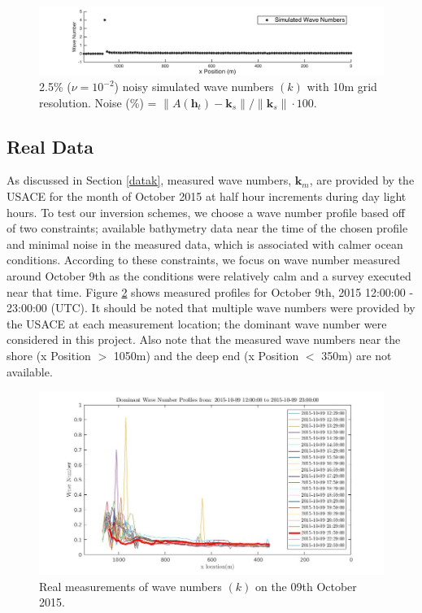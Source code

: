 \begin{figure}[H]
\center
\includegraphics[scale=0.6]{img/simulated_data_k10m.png} 
\caption{2.5\% ($\nu = 10^{-2}$) noisy simulated wave numbers $(k)$ with 10m grid resolution. Noise (\%) = $\|A(\mathbf{h}_t) -  \mathbf{k}_s\| / \|  \mathbf{k}_s \| \cdot 100$. }
\label{Simulated10m}
\end{figure}


\subsection{Real Data}\label{realData}

As discussed in Section \ref{datak}, measured wave numbers, $\mathbf{k}_m$, are provided by the USACE for the month of October 2015 at half hour increments during day light hours. To test our inversion schemes, we choose a wave number profile based off of two constraints; available bathymetry data near the time of the chosen profile and minimal noise in the measured data, which is associated with calmer ocean conditions. According to these constraints, we focus on wave number measured around October 9th as the conditions were relatively calm and a survey executed near that time. Figure \ref{RealData_oct09} shows measured profiles for October 9th, 2015 12:00:00 - 23:00:00 (UTC). It should be noted that multiple wave numbers were provided by the USACE at each measurement location; the dominant wave number were considered in this project. Also note that the measured wave numbers near the shore (x Position $>$ 1050m) and the deep end (x Position $<$ 350m) are not available.


\begin{figure}[H]
\center
\includegraphics[scale=0.5]{img/Real_k_data.jpg} 
\caption{Real measurements of wave numbers $(k)$ on the 09th October 2015.}
\label{RealData_oct09}
\end{figure}

